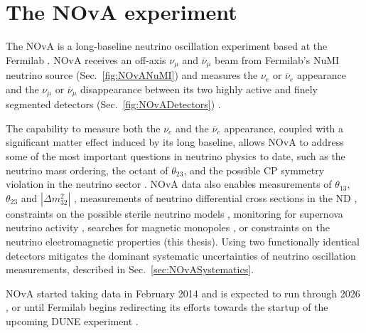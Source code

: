 \chapter{The NOvA experiment}\label{sec:NOvA}

The \gls{NOvA} \cite{NOvAWebsite} is a long-baseline neutrino oscillation experiment based at the \gls{Fermilab}
\cite{FNALWebsite}. \gls{NOvA} receives an off-axis $\nu_\mu$ and $\overline{\nu}_\mu$ beam from \gls{Fermilab}'s \gls{NuMI} neutrino source (Sec.~\ref{fig:NOvANuMI}) and measures the $\nu_e$ or $\overline{\nu}_e$ appearance and the $\nu_\mu$ or $\overline{\nu}_\mu$ disappearance between its two highly active and finely segmented detectors (Sec.~\ref{fig:NOvADetectors}) \cite{PhysicsOfNOvA.pdf}. 

The capability to measure both the $\nu_e$ and the $\overline{\nu}_e$ appearance, coupled with a significant matter effect induced by its long baseline, allows \gls{NOvA} to address some of the most important questions in neutrino physics to date, such as the neutrino mass ordering, the octant of $\theta_{23}$, and the possible \gls{CP} symmetry violation in the neutrino sector \cite{PhysicsOfNOvA.pdf,NOvAStatusAndOutlook.pdf,FirstNOvAResult.pdf,2019NOvAFHCRHCResults.pdf,NOvAResults2021.pdf}. \gls{NOvA} data also enables measurements of $\theta_{13}$, $\theta_{23}$ and $\left|\Delta m^2_{32}\right|$ \cite{PhysicsOfNOvA.pdf}, measurements of neutrino differential cross sections in the \gls{ND} \cite{NOvANCPi0XSecMeasurement2019.pdf, NOvANumuCCXSexMeasurement2023.pdf, NOvANueCCXSecMeasurement2023.pdf, NOvANuMuCCPi0XSecMeasurement2023.pdf}, constraints on the possible sterile neutrino models \cite{NOvASterilesFHCResults2017.pdf, NOvASterilesFHCRHCResults2021.pdf}, monitoring for supernova neutrino activity \cite{NOvASupernovaMeasurements2020.pdf, NOvASupernovaCoincidenceMeasurements2021.pdf}, searches for magnetic monopoles \cite{NOvASlowMagMonopoles2021.pdf}, or constraints on the neutrino electromagnetic properties (this thesis). Using two functionally identical detectors mitigates the dominant systematic uncertainties of neutrino oscillation measurements, described in Sec.~\ref{sec:NOvASystematics}.


\gls{NOvA} started taking data in February 2014 and is expected to run through 2026 \cite{NOvAHalfTimeOverview2022.pdf}, or until \gls{Fermilab} begins redirecting its efforts towards the startup of the upcoming \gls{DUNE} experiment \cite{NOvAPhysicsThrough2025SnowmassLOI.pdf}.

